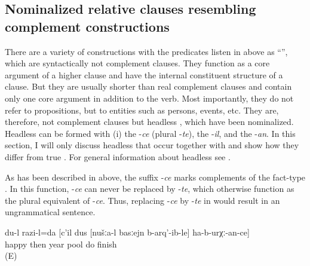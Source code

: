 \subsection{Nominalized relative clauses resembling complement constructions}
\label{ssec:Nominalized relative clauses resembling complement constructions}
There are a variety of constructions with the predicates listen in  above as ``'', which are syntactically not complement clauses. They function as a core argument of a higher clause and have the internal constituent structure of a clause. But they are usually shorter than real complement clauses and contain only one core argument in addition to the verb. Most importantly, they do not refer to propositions, but to entities such as persons, events, etc. They are, therefore, not complement clauses but headless , which have been nominalized. Headless  can be formed with (i) the  -\textit{ce} (plural -\textit{te}), the  -\textit{il}, and the  -\textit{an}. In this section, I will only discuss headless  that occur together with  and show how they differ from true . For general information about headless  see .

As has been described in  above, the suffix -\textit{ce} marks complements of the fact-type . In this function, -\textit{ce} can never be replaced by  -\textit{te}, which otherwise function as the plural equivalent of -\textit{ce}. Thus, replacing -\textit{ce} by -\textit{te} in  would result in an ungrammatical sentence.

\begin{exe}
		\ex	\label{‎‎‎I am happy that during the next year we will finish}
	\gll	du-l		razi-l=da		[c'il	dus	[nušːa-l	basːejn	b-arq'-ib-le]		ha-b-urχː-an-ce]\\
			happy	then	year		pool	do	finish \\
	\glt	{} (E)
\end{exe}
	
